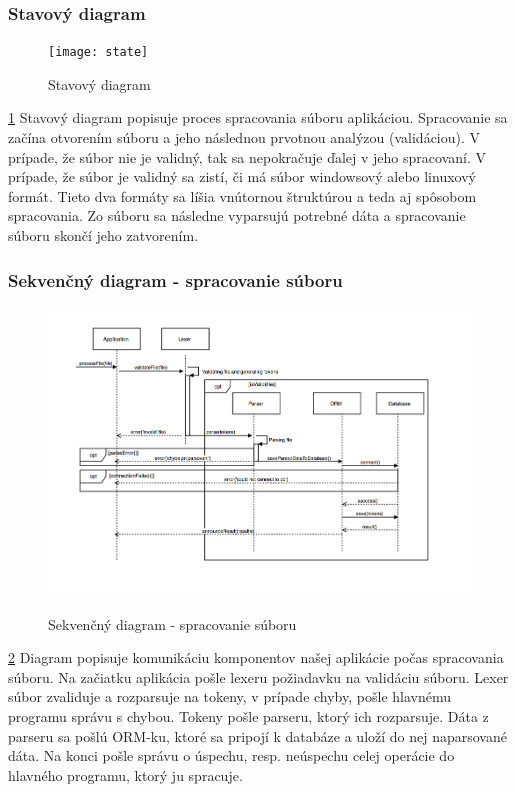\documentclass[12pt,a4paper]{article}
\begin{document}
\subsubsection{Stavový diagram}
\begin{figure}[H]
	\centering
	\caption{Stavový diagram}
	\texttt{[image: state]}
	\label{fig:state}
\end{figure}
\ref{fig:state}
Stavový diagram popisuje proces spracovania súboru aplikáciou. Spracovanie sa začína otvorením súboru a jeho následnou prvotnou analýzou (validáciou). V prípade, že súbor nie je validný, tak sa nepokračuje ďalej v jeho spracovaní. V prípade, že súbor je validný sa zistí, či má súbor windowsový alebo linuxový formát. Tieto dva formáty sa líšia vnútornou štruktúrou a teda aj spôsobom spracovania. Zo súboru sa následne vyparsujú potrebné dáta a spracovanie súboru skončí jeho zatvorením. 

\subsubsection{Sekvenčný diagram - spracovanie súboru}
\begin{figure}[H]
	\caption{Sekvenčný diagram - spracovanie súboru}
	\includegraphics[width=\textwidth]{sequence_file}
	\label{fig:seq}
\end{figure}
\ref{fig:seq}
Diagram popisuje komunikáciu komponentov našej aplikácie počas spracovania súboru. Na začiatku aplikácia pošle lexeru požiadavku na validáciu súboru. Lexer súbor zvaliduje a rozparsuje na tokeny, v prípade chyby, pošle hlavnému programu správu s chybou. Tokeny pošle parseru, ktorý ich rozparsuje. Dáta z parseru sa pošlú ORM-ku, ktoré sa pripojí k databáze a uloží do nej naparsované dáta. Na konci pošle správu o úspechu, resp. neúspechu celej operácie do hlavného programu, ktorý ju spracuje.
\end{document}
